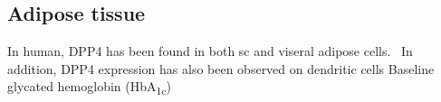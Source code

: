 \subsection{Adipose tissue}
In human, DPP4 has been found in both sc and viseral adipose cells.~\cite{Lamers2011} In addition, DPP4 expression has also been observed on dendritic cells Baseline glycated hemoglobin (HbA\textsubscript{1c}) 